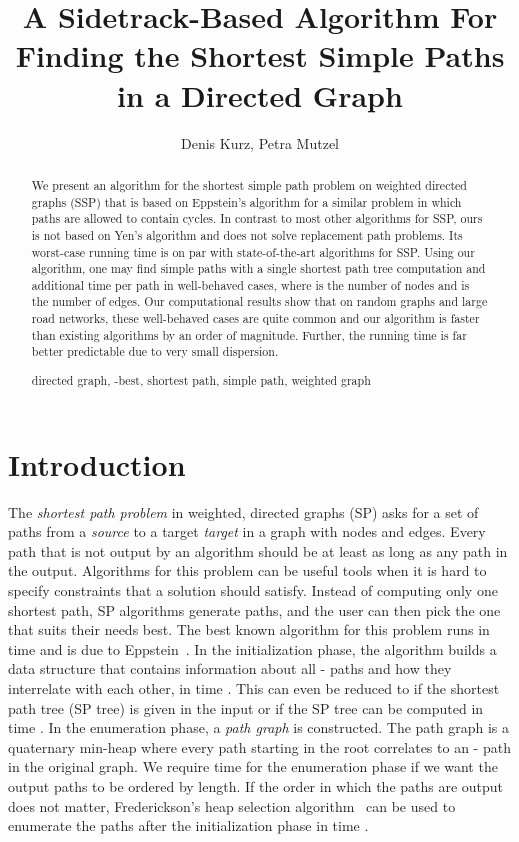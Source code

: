 \documentclass[runningheads,a4paper]{llncs}
\title{A Sidetrack-Based Algorithm For Finding the  Shortest Simple Paths in a Directed Graph}
\author{Denis Kurz, Petra Mutzel}
\institute{Department of Computer Science, TU Dortmund, Germany\\
\email{\{denis.kurz,petra.mutzel\}@tu-dortmund.de}}
\newcommand{\keywords}[1]{\par\addvspace\baselineskip
\noindent\keywordname\enspace\ignorespaces#1}
\begin{document}
\def\sectionautorefname{Section}
\def\figureautorefname{Figure}
\def\tableautorefname{Table}
\def\theoremautorefname{Theorem}

\mainmatter
\maketitle

\begin{abstract}
We present an algorithm for the  shortest simple path problem on weighted directed graphs (SSP) that is based on Eppstein's algorithm for a similar problem in which paths are allowed to contain cycles.
In contrast to most other algorithms for SSP, ours is not based on Yen's algorithm \cite{CUSTOM:journals/networks/Yen71} and does not solve replacement path problems.
Its worst-case running time is on par with state-of-the-art algorithms for SSP.
Using our algorithm, one may find  simple paths with a single shortest path tree computation and  additional time per path in well-behaved cases, where  is the number of nodes and  is the number of edges.
Our computational results show that on random graphs and large road networks, these well-behaved cases are quite common and our algorithm is faster than existing algorithms by an order of magnitude.
Further, the running time is far better predictable due to very small dispersion.
\keywords{directed graph, -best, shortest path, simple path, weighted graph}
\end{abstract}


\section{Introduction}
\label{sec:introduction}

The \emph{ shortest path problem} in weighted, directed graphs (SP) asks for a set of  paths from a \emph{source}  to a target \emph{target}  in a graph with  nodes and  edges.
Every path that is not output by an algorithm should be at least as long as any path in the output.
Algorithms for this problem can be useful tools when it is hard to specify constraints that a solution should satisfy.
Instead of computing only one shortest path, SP algorithms generate  paths, and the user can then pick the one that suits their needs best.
The best known algorithm for this problem runs in time  and is due to Eppstein~\cite{DBLP:journals/siamcomp/Eppstein98}.
In the initialization phase, the algorithm builds a data structure that contains information about all - paths and how they interrelate with each other, in time .
This can even be reduced to  if the shortest path tree (SP tree) is given in the input or if the SP tree can be computed in time .
In the enumeration phase, a \emph{path graph} is constructed.
The path graph is a quaternary min-heap where every path starting in the root correlates to an - path in the original graph.
We require  time for the enumeration phase if we want the output paths to be ordered by length.
If the order in which the paths are output does not matter, Frederickson's heap selection algorithm~\cite{DBLP:journals/iandc/Frederickson93} can be used to enumerate the paths after the initialization phase in time .
\end{document}
